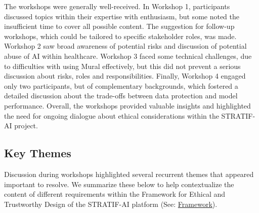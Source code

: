 \documentclass[
  letterpaper,
  DIV=11,
  numbers=noendperiod]{scrreport}
\begin{document}
The workshops were generally well-received. In Workshop 1, participants
discussed topics within their expertise with enthusiasm, but some noted
the insufficient time to cover all possible content. The suggestion for
follow-up workshops, which could be tailored to specific stakeholder
roles, was made. Workshop 2 saw broad awareness of potential risks and
discussion of potential abuse of AI within healthcare. Workshop 3 faced
some technical challenges, due to difficulties with using Mural
effectively, but this did not prevent a serious discussion about risks,
roles and responsibilities. Finally, Workshop 4 engaged only two
participants, but of complementary backgrounds, which fostered a
detailed discussion about the trade-offs between data protection and
model performance. Overall, the workshops provided valuable insights and
highlighted the need for ongoing dialogue about ethical considerations
within the STRATIF-AI project.

\hypertarget{key-themes}{%
\subsection*{Key Themes}\label{key-themes}}

Discussion during workshops highlighted several recurrent themes that
appeared important to resolve. We summarize these below to help
contextualize the content of different requirements within the Framework
for Ethical and Trustworthy Design of the STRATIF-AI platform (See:
\protect\hyperlink{framework}{Framework}).
\end{document}
